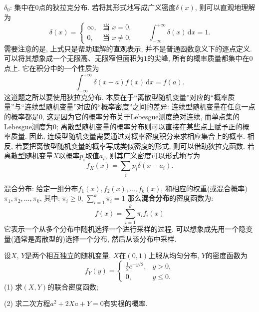 \documentclass[standard]{ExBook}
\renewenvironment{shaded}{%
  \def\FrameCommand{\fboxsep=\FrameSep \colorbox{shadecolor}}%
  \MakeFramed{\advance\hsize-\width \FrameRestore}%
}{%
  \endMakeFramed
}
\begin{document}
\begin{qitems}
\textcolor{themeColor}{\selectfont {}
$\delta_0$: 集中在$0$点的狄拉克分布. 若将其形式地写成广义密度$\delta(x)$,
则可以直观地理解为
\[
\delta(x)=
\begin{cases}
\infty, & \text{当 }x=0,\\
0, & \text{当 }x\neq0,
\end{cases}
\qquad
\int_{-\infty}^{+\infty}\delta(x)\,\mathrm{d}x=1.
\]
需要注意的是, 上式只是帮助理解的直观表示, 并不是普通函数意义下的逐点定义. 可以将其想象成一个无限高、无限窄但面积为$1$的尖峰, 所有的概率质量都集中在$0$点上. 它在积分中的一个性质为
\[
\int_{-\infty}^{+\infty}\delta(x-a)f(x)\,\mathrm{d}x=f(a).
\]
这道题之所以要使用狄拉克分布, 本质在于``离散型随机变量''对应的``概率质量''与``连续型随机变量''对应的``概率密度''之间的差异: 连续型随机变量在任意一点的概率都是$0$, 这是因为它的概率分布关于Lebesgue测度绝对连续, 而单点集的Lebesgue测度为$0$; 离散型随机变量的概率分布则可以直接在某些点上赋予正的概率质量. 因此, 连续型随机变量需要通过对概率密度积分来求相应集合上的概率. 相反, 若要把离散型随机变量的概率写成类似密度的形式, 则可以借助狄拉克函数. 若离散型随机变量$X$以概率$p_i$取值$a_i$, 则其广义密度可以形式地写为
\[
f_X(x)=\sum_i p_i\delta(x-a_i).
\]
}

\textcolor{themeColor}{\selectfont {} 混合分布: 给定一组分布\( f_1(x), f_2(x), \dots, f_k(x) \), 和相应的权重(或混合概率)\( \pi_1, \pi_2, \dots, \pi_k \), 其中:
\( \pi_i \geq 0 \), 
\( \sum_{i=1}^k \pi_i = 1 \)
那么\textbf{混合分布}的密度函数为: 
\[
f(x) = \sum_{i=1}^k \pi_i f_i(x)
\]
它表示一个从多个分布中随机选择一个进行采样的过程. 可以想象成先用一个隐变量(通常是离散型的)选择一个分布, 然后从该分布中采样.
}

\vspace{2.5cm-5em}

    \begin{bbox}
    \begin{shaded}
        \qitem
设$X$, $Y$是两个相互独立的随机变量, $X$在$(0,1)$上服从均匀分布, $Y$的密度函数为
$$
    f_{Y}(y)=
    \left\{
    \begin{array}{ll}
        \displaystyle\frac{1}{2}e^{-y/2}, & y>0,\\
        0, & y\leq 0.
    \end{array}
    \right.
$$
(1) 求$(X, Y)$的联合密度函数;

(2) 求二次方程$a^2+2Xa+Y=0$有实根的概率.
    \end{shaded}
    \end{bbox}

\vspace{\dimexpr2.5cm-5em\relax}


\end{qitems}
\end{document}
